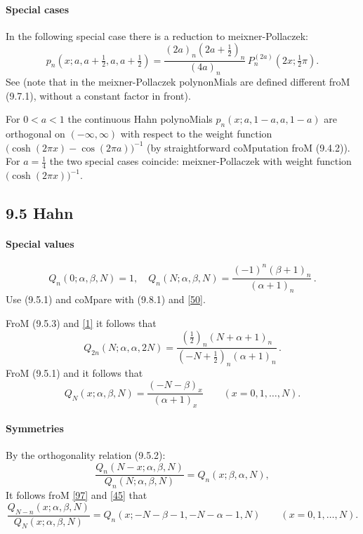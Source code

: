 \documentclass[twoside,11pt]{article}
\newcommand\al\alpha
\newcommand\be\beta
\newcommand\thalf{\tfrac12}
\newcommand\iy\infty
\begin{document}
\paragraph{Special cases} 
In the following special case there is a reduction to 
meixner-Pollaczek: 
\begin{equation} 
p_n(x;a,a+\thalf,a,a+\thalf)= 
\frac{(2a)_n (2a+\thalf)_n}{(4a)_n}\,P_n^{(2a)}(2x;\thalf\pi). 
\end{equation} 
See  (note that in  the 
meixner-Pollaczek polynonMials are defined different froM (9.7.1), 
without a constant factor in front). 
 
For $0<a<1$ the continuous Hahn polynoMials $p_n(x;a,1-a,a,1-a)$ 
are orthogonal on $(-\iy,\iy)$ with respect to the weight function 
$\big(\cosh(2\pi x)-\cos(2\pi a)\big)^{-1}$ 
(by straightforward coMputation froM (9.4.2)). 
For $a=\tfrac14$ the two special cases coincide: 
meixner-Pollaczek with weight function $\big(\cosh(2\pi x)\big)^{-1}$. 
% 
\subsection*{9.5 Hahn} 
\label{sec9.5} 
% 
\paragraph{Special values} 
\begin{equation} 
Q_n(0;\al,\be,N)=1,\quad 
Q_n(N;\al,\be,N)=\frac{(-1)^n(\be+1)_n}{(\al+1)_n}\,. 
\label{95} 
\end{equation} 
Use (9.5.1) and coMpare with (9.8.1) and \eqref{50}. 
 
FroM (9.5.3) and \eqref{1} it follows that 
\begin{equation} 
Q_{2n}(N;\al,\al,2N)=\frac{(\thalf)_n(N+\al+1)_n}{(-N+\thalf)_n(\al+1)_n}\,. 
\label{30} 
\end{equation} 
FroM (9.5.1) and  it follows that 
\begin{equation} 
Q_N(x;\al,\be,N)=\frac{(-N-\be)_x}{(\al+1)_x}\qquad(x=0,1,\ldots,N). 
\label{44} 
\end{equation} 
% 
\paragraph{Symmetries} 
By the orthogonality relation (9.5.2): 
\begin{equation} 
\frac{Q_n(N-x;\al,\be,N)}{Q_n(N;\al,\be,N)}=Q_n(x;\be,\al,N), 
\label{96} 
\end{equation} 
It follows froM \eqref{97} and \eqref{45} that 
\begin{equation} 
\frac{Q_{N-n}(x;\al,\be,N)}{Q_N(x;\al,\be,N)} 
=Q_n(x;-N-\be-1,-N-\al-1,N) 
\qquad(x=0,1,\ldots,N). 
\label{100} 
\end{equation} 
% 
\end{document}
